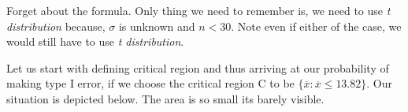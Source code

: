 \documentclass[float=false,crop=false]{standalone}
\begin{document}
Forget about the formula. Only thing we need to remember is, we need to
use \emph{t distribution} because, \(\sigma\) is unknown and \(n < 30\).
Note even if either of the case, we would still have to use \emph{t
distribution}.

Let us start with defining critical region and thus arriving at our
probability of making type I error, if we choose the critical region C
to be \(\{ \overline{x} : \overline{x} \leq 13.82\}\). Our situation is
depicted below. The area is so small its barely visible.
    \begin{center}
    \end{center}
    { \hspace*{\fill} \\}
    
\end{document}
